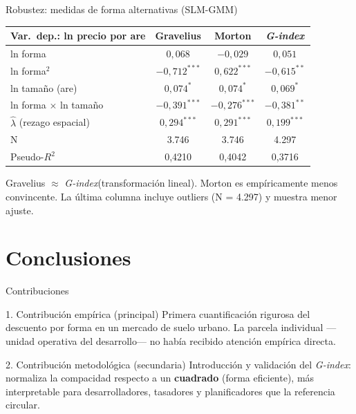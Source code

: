 \documentclass[11pt,aspectratio=169]{beamer}
\newcommand{\Gindex}{\textit{G-index}\xspace}
\begin{document}
\begin{frame}{Robustez: medidas de forma alternativas (SLM-GMM)}
  \centering
  \begin{table}\small
  \begin{tabular}{lccc}
    \toprule
    Var.\ dep.: ln precio por are & Gravelius & Morton & \Gindex \\
    \midrule
    ln forma & $0{,}068$ & $-0{,}029$ & $0{,}051$ \\
    ln forma$^2$ & $-0{,}712^{***}$ & $0{,}622^{***}$ & $-0{,}615^{**}$ \\
    ln tamaño (are) & $0{,}074^{*}$ & $0{,}074^{*}$ & $0{,}069^{*}$ \\
    ln forma $\times$ ln tamaño & $-0{,}391^{***}$ & $-0{,}276^{***}$ & $-0{,}381^{**}$ \\
    \midrule
    $\hat\lambda$ (rezago espacial) & $0{,}294^{***}$ & $0{,}291^{***}$ & $0{,}199^{***}$ \\
    N & 3.746 & 3.746 & 4.297 \\
    Pseudo-$R^2$ & 0,4210 & 0,4042 & 0,3716 \\
    \bottomrule
  \end{tabular}
  \end{table}
  \vspace{0.4em}
  \footnotesize Gravelius $\approx$ \Gindex (transformación lineal). Morton es empíricamente menos convincente. La última columna incluye outliers (N = 4.297) y muestra menor ajuste.
\end{frame}

\section{Conclusiones}
\begin{frame}{Contribuciones}
  \begin{block}{1. Contribución empírica (principal)}
    Primera cuantificación rigurosa del \alert{descuento por forma} en un mercado de suelo urbano. La parcela individual —unidad operativa del desarrollo— no había recibido atención empírica directa.
  \end{block}
  \begin{block}{2. Contribución metodológica (secundaria)}
    Introducción y validación del \alert{\Gindex}: normaliza la compacidad respecto a un \textbf{cuadrado} (forma eficiente), más interpretable para desarrolladores, tasadores y planificadores que la referencia circular.
  \end{block}
\end{frame}
\end{document}
